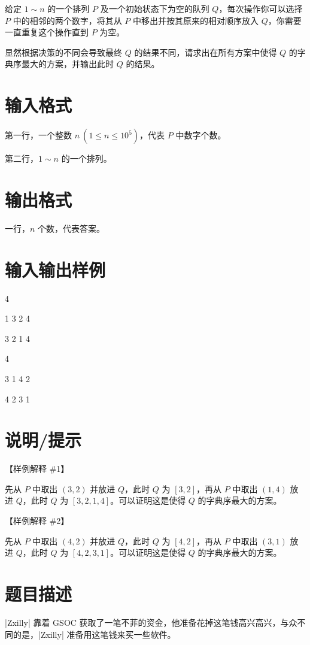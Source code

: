 \documentclass{ctpro}
\begin{document}
给定 $1 \sim n$ 的一个排列 $P$ 及一个初始状态下为空的队列 $Q$，每次操作你可以选择 $P$ 中的相邻的两个数字，将其从 $P$ 中移出并按其原来的相对顺序放入 $Q$，你需要一直重复这个操作直到 $P$ 为空。

显然根据决策的不同会导致最终 $Q$ 的结果不同，请求出在所有方案中使得 $Q$ 的字典序最大的方案，并输出此时 $Q$ 的结果。

\section*{输入格式}

第一行，一个整数 $n~(1 \leq n \leq {10}^5)$，代表 $P$ 中数字个数。

第二行，$1 \sim n$ 的一个排列。

\section*{输出格式}

一行，$n$ 个数，代表答案。

\section*{输入输出样例}
\testcasetab
{
	4\par
	1 3 2 4
}
{
	3 2 1 4
}
\testcasetab
{
	4\par
	3 1 4 2
}
{
	4 2 3 1
}

\section*{说明/提示}

【样例解释 \#1】

先从 $P$ 中取出 $(3,2)$ 并放进 $Q$，此时 $Q$ 为 $[3,2]$，再从 $P$ 中取出 $(1,4)$ 放进 $Q$，此时 $Q$ 为 $[3,2,1,4]$。可以证明这是使得 $Q$ 的字典序最大的方案。

【样例解释 \#2】

先从 $P$ 中取出 $(4,2)$ 并放进 $Q$，此时 $Q$ 为 $[4,2]$，再从 $P$ 中取出 $(3,1)$ 放进 $Q$，此时 $Q$ 为 $[4,2,3,1]$。可以证明这是使得 $Q$ 的字典序最大的方案。


\makeproblem
\section*{题目描述}

|Zxilly| 靠着 GSOC 获取了一笔不菲的资金，他准备花掉这笔钱高兴高兴，与众不同的是，|Zxilly| 准备用这笔钱来买一些软件。
\end{document}
